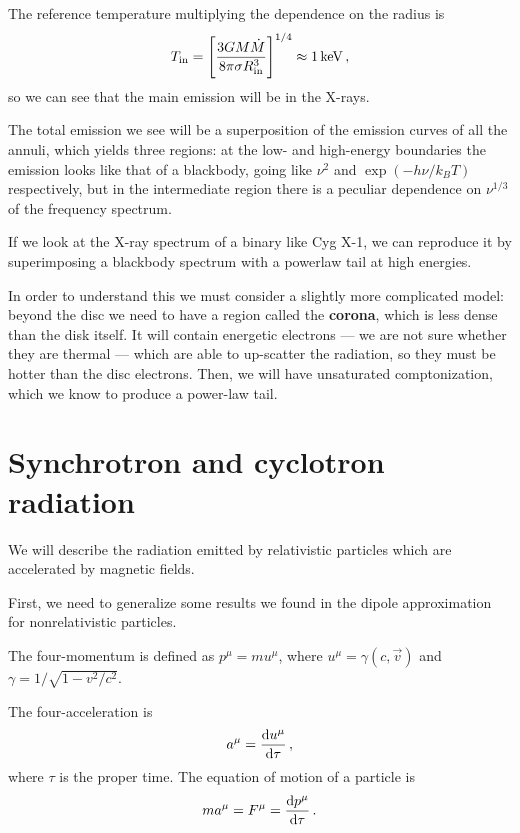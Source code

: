 \documentclass[main.tex]{subfiles}
\begin{document}
The reference temperature multiplying the dependence on the radius is 
%
\begin{align}
T _{\text{in}} = \qty[\frac{3 GM \dot{M}}{8 \pi \sigma R _{\text{in}}^3 }]^{1/4} \approx \SI{1}{keV}
\,,
\end{align}
%
so we can see that the main emission will be in the X-rays. 

The total emission we see will be a superposition of the emission curves of all the annuli, which yields three regions: at the low- and high-energy boundaries the emission looks like that of a blackbody, going like \(\nu^{2}\) and \(\exp(- h \nu  / k_B T)\) respectively, but in the intermediate region there is a peculiar dependence on \(\nu^{1/3}\) of the frequency spectrum. 

If we look at the X-ray spectrum of a binary like Cyg X-1, we can reproduce it by superimposing a blackbody spectrum with a powerlaw tail at high energies. 

In order to understand this we must consider a slightly more complicated model: beyond the disc we need to have a region called the \textbf{corona}, which is less dense than the disk itself.
It will contain energetic electrons --- we are not sure whether they are thermal --- which are able to up-scatter the radiation, so they must be hotter than the disc electrons. 
Then, we will have unsaturated comptonization, which we know to produce a power-law tail. 

\section{Synchrotron and cyclotron radiation}

We will describe the radiation emitted by relativistic particles which are accelerated by magnetic fields. 

First, we need to generalize some results we found in the dipole approximation for nonrelativistic particles.

The four-momentum is defined as \(p^{\mu } = m u^{\mu }\), where \(u^{\mu }= \gamma (c, \vec{v})\) and \(\gamma = 1/ \sqrt{1 - v^2 / c^2}\). 

The four-acceleration is 
%
\begin{align}
a^{\mu } = \dv{ u^{\mu }}{\tau }
\,,
\end{align}
%
where \(\tau \) is the proper time. The equation of motion of a particle is 
%
\begin{align}
m a^{\mu } = F^{\mu } = \dv{p^{\mu }}{\tau }
\,.
\end{align}
\end{document}

